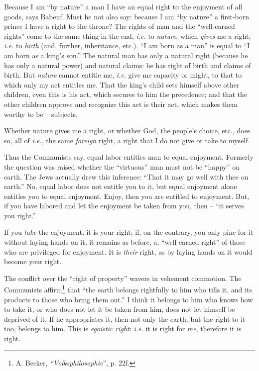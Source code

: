 Because I am ``by nature'' a man I have an equal right to the enjoyment of 
all goods, says Babeuf. Must he not also say: because I am ``by nature'' a 
first-born prince I have a right to the throne? The rights of man and the 
``well-earned rights'' come to the same thing in the end, \textit{i.e.} to 
\textit{nature}, which \textit{gives} me a right, \textit{i.e.} to 
\textit{birth} (and, further, inheritance, etc.). ``I am born as a man'' is 
equal to ``I am born as a king's son.'' The natural man has only a natural 
right (because he has only a natural power) and natural claims: he has right 
of birth and claims of birth. But \textit{nature} cannot entitle me, 
\textit{i.e.} give me capacity or might, to that to which only my act entitles 
me. That the king's child sets himself above other children, even this is his 
act, which secures to him the precedence; and that the other children approve 
and recognize this act is their act, which makes them worthy to be -- 
subjects.

Whether nature gives me a right, or whether God, the people's choice, etc., 
does so, all of \textit{i.e.}, the same \textit{foreign} right, a right that 
I do not give or take to myself.

Thus the Communists say, equal labor entitles man to equal enjoyment. Formerly 
the question was raised whether the ``virtuous'' man must not be ``happy'' 
on earth. The Jews actually drew this inference: ``That it may go well with 
thee on earth.'' No, equal labor does not entitle you to it, but equal 
enjoyment alone entitles you to equal enjoyment. Enjoy, then you are entitled 
to enjoyment. But, if you have labored and let the enjoyment be taken from 
you, then -- ``it serves you right.''

If you \textit{take} the enjoyment, it is your right; if, on the contrary, you 
only pine for it without laying hands on it, it remains as before, a, 
``well-earned right'' of those who are privileged for enjoyment. It is 
\textit{their} right, as by laying hands on it would become your right.

The conflict over the ``right of property'' wavers in vehement commotion. 
The Communists affirm\footnote{A. Becker, \textit{``Volksphilosophie}'', p. 
22f.} that ``the earth belongs rightfully to him who tills it, and its 
products to those who bring them out.'' I think it belongs to him who knows 
how to take it, or who does not let it be taken from him, does not let himself 
be deprived of it. If he appropriates it, then not only the earth, but the 
right to it too, belongs to him. This is \textit{egoistic right}: 
\textit{i.e.} it is right for \textit{me}, therefore it is right.

